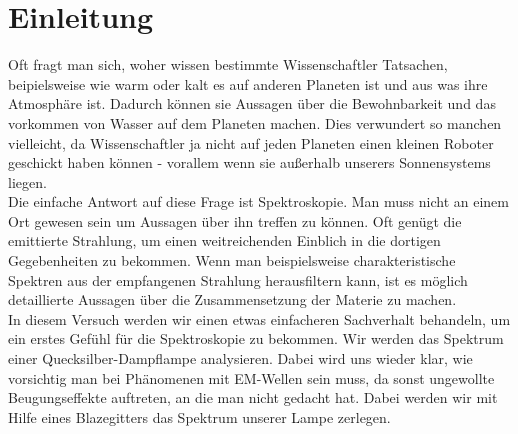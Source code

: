 

\chapter{Einleitung}
\label{chap:einleitung}


Oft fragt man sich, woher wissen bestimmte Wissenschaftler Tatsachen, beipielsweise wie warm oder kalt es auf anderen 
Planeten ist und aus was ihre Atmosphäre ist. Dadurch können sie Aussagen über die Bewohnbarkeit und das vorkommen von Wasser auf dem Planeten machen. Dies verwundert so manchen 
vielleicht, da Wissenschaftler ja nicht auf jeden Planeten einen kleinen Roboter geschickt haben können - 
vorallem wenn sie außerhalb unserers Sonnensystems liegen.\\
Die einfache Antwort auf diese Frage ist Spektroskopie. Man muss nicht an einem Ort gewesen sein um Aussagen über ihn treffen zu können. Oft genügt die emittierte Strahlung,
um einen weitreichenden Einblich in die dortigen Gegebenheiten zu bekommen. Wenn man beispielsweise charakteristische Spektren aus der empfangenen Strahlung herausfiltern kann, 
ist es möglich detaillierte Aussagen über die Zusammensetzung der Materie zu machen.\\
In diesem Versuch werden wir einen etwas einfacheren Sachverhalt behandeln, um ein erstes Gefühl für die Spektroskopie zu bekommen. Wir werden das Spektrum einer Quecksilber-Dampflampe 
analysieren. Dabei wird uns wieder klar, wie vorsichtig man bei Phänomenen mit EM-Wellen sein muss, da sonst ungewollte Beugungseffekte auftreten, an die man nicht gedacht hat.
Dabei werden wir mit Hilfe eines Blazegitters das Spektrum unserer Lampe zerlegen.